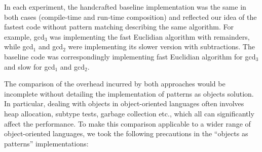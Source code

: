 In each experiment, the handcrafted baseline implementation was the same in 
both cases (compile-time and run-time composition) and reflected our idea of the 
fastest code without pattern matching describing the same algorithm. For 
example, gcd$_3$ was implementing the fast Euclidian algorithm with remainders, 
while gcd$_1$ and gcd$_2$ were implementing its slower version with 
subtractions. The baseline code was correspondingly implementing fast Euclidian 
algorithm for gcd$_3$ and slow for gcd$_1$ and gcd$_2$.

The comparison of the overhead incurred by both approaches would be incomplete 
without detailing the implementation of patterns as objects solution. In particular, 
dealing with objects in object-oriented languages often involves heap allocation, 
subtype tests, garbage collection etc., which all can significantly affect the 
performance. To make this comparison applicable to a wider range of 
object-oriented languages, we took the following precautions in the 
``objects as patterns'' implementations:

